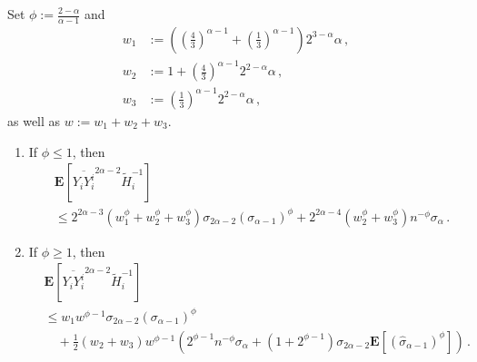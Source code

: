\documentclass{article}
\newcommand{\lab}{\left[} %
\newcommand{\rab}{\right]} %
\newcommand{\ab}[1]{\lab #1 \rab} %
\newcommand{\abOf}[1]{\!\ab{#1}} %
\newcommand{\lb}{\left(} %
\newcommand{\rb}{\right)} %
\newcommand{\br}[1]{\lb #1 \rb} %
\newcommand{\E}{\mathbf{E}} %
\newcommand{\EOf}[1]{\E\abOf{#1}}
\newcommand{\eqcm}{\,,} %
\newcommand{\eqfs}{\,.}
\newcommand{\ol}[2]{\overline{#1#2}}
\begin{document}
%
%
%
\begin{lemma}\label{lmm:power:iid:weights}
    Set $\phi := \frac{2-\alpha}{\alpha-1}$ and
    \begin{align}
        w_1 &:= \br{\br{\frac43}^{\alpha-1}  + \br{\frac13}^{\alpha-1}} 2^{3-\alpha} \alpha
        \eqcm\\ 
        w_2 &:= 1 + \br{\frac43}^{\alpha-1} 2^{2-\alpha} \alpha
        \eqcm\\
        w_3 &:= \br{\frac13}^{\alpha-1} 2^{2-\alpha} \alpha
        \eqcm
    \end{align}
    as well as $w := w_1+w_2+w_3$.
	\begin{enumerate}[label=(\roman*)]
		\item
		If $\phi \leq 1$, then
		\begin{align}
			&\EOf{\ol {Y_i}{Y_i^i}^{2\alpha-2} \tilde H_i^{-1}}
			\\&\leq
			2^{2\alpha-3} \br{w_1^{\phi}+w_2^{\phi}+w_3^{\phi}} \sigma_{2\alpha-2} (\sigma_{\alpha-1})^{\phi}
			+
			2^{2\alpha-4}  \br{w_2^{\phi}+w_3^{\phi}} n^{-\phi} \sigma_\alpha 
            \eqfs
		\end{align}
		\item 
		If $\phi\geq 1$, then
		\begin{align}
			&\EOf{
				\ol {Y_i}{Y_i^i}^{2\alpha-2}
				\tilde H_i^{-1}
			}
			\\&\leq
			w_1 w^{\phi-1} \sigma_{2\alpha-2} (\sigma_{\alpha-1})^\phi
			\\&\quad +
			\frac12 (w_2+w_3) w^{\phi-1} \br{
				2^{\phi-1} n^{-\phi} \sigma_{\alpha} + \br{1+2^{\phi-1}} \sigma_{2\alpha-2} \EOf{(\hat\sigma_{\alpha-1})^{\phi}}
			}
            \eqfs
		\end{align}
	\end{enumerate}
\end{lemma}
\end{document}
